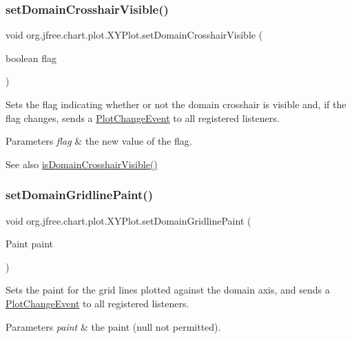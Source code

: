 \subsubsection{\texorpdfstring{set\+Domain\+Crosshair\+Visible()}{setDomainCrosshairVisible()}}
{\footnotesize\ttfamily void org.\+jfree.\+chart.\+plot.\+X\+Y\+Plot.\+set\+Domain\+Crosshair\+Visible (\begin{DoxyParamCaption}\item[{boolean}]{flag }\end{DoxyParamCaption})}

Sets the flag indicating whether or not the domain crosshair is visible and, if the flag changes, sends a \mbox{\hyperlink{}{Plot\+Change\+Event}} to all registered listeners.


\begin{DoxyParams}{Parameters}
{\em flag} & the new value of the flag.\\
\hline
\end{DoxyParams}
\begin{DoxySeeAlso}{See also}
\mbox{\hyperlink{classorg_1_1jfree_1_1chart_1_1plot_1_1_x_y_plot_ae1fc992f5b9f115943993c300b669c8d}{is\+Domain\+Crosshair\+Visible()}} 
\end{DoxySeeAlso}
\mbox{\label{classorg_1_1jfree_1_1chart_1_1plot_1_1_x_y_plot_a1b2e660d873040b9cdc3d29a79d03e7a}} 
\subsubsection{\texorpdfstring{set\+Domain\+Gridline\+Paint()}{setDomainGridlinePaint()}}
{\footnotesize\ttfamily void org.\+jfree.\+chart.\+plot.\+X\+Y\+Plot.\+set\+Domain\+Gridline\+Paint (\begin{DoxyParamCaption}\item[{Paint}]{paint }\end{DoxyParamCaption})}

Sets the paint for the grid lines plotted against the domain axis, and sends a \mbox{\hyperlink{}{Plot\+Change\+Event}} to all registered listeners.


\begin{DoxyParams}{Parameters}
{\em paint} & the paint ({\ttfamily null} not permitted).\\
\hline
\end{DoxyParams}


